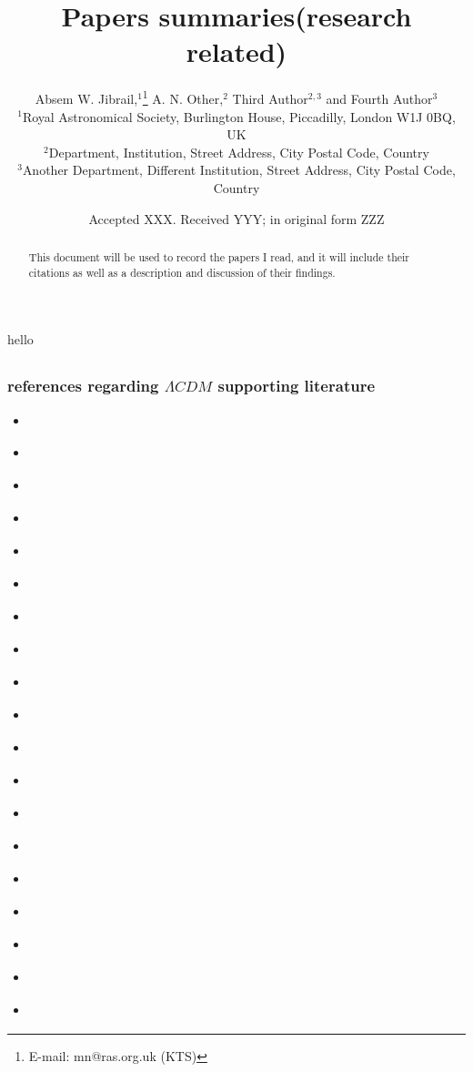 \documentclass[fleqn,usenatbib]{mnras}
\title[Paper summaries (research related)]{Papers summaries(research related)}
\author[K. T. Smith et al.]{
Absem W. Jibrail,$^{1}$\thanks{E-mail: mn@ras.org.uk (KTS)}
A. N. Other,$^{2}$
Third Author$^{2,3}$
and Fourth Author$^{3}$
\\
$^{1}$Royal Astronomical Society, Burlington House, Piccadilly, London W1J 0BQ, UK\\
$^{2}$Department, Institution, Street Address, City Postal Code, Country\\
$^{3}$Another Department, Different Institution, Street Address, City Postal Code, Country
}
\date{Accepted XXX. Received YYY; in original form ZZZ}
\begin{document}
\label{firstpage}
\pagerange{\pageref{firstpage}--\pageref{lastpage}}
\maketitle

\begin{abstract}
This document will be used to record the papers I read, and it will include their citations as well as a description and discussion of their findings.
\end{abstract}

\begin{keywords}
hello
\end{keywords}






\subsection{\citet{Adermann_17}}
\subsubsection{references regarding $\Lambda CDM$ supporting literature}
\begin{itemize}
\item \citet{Riess_98}
\item \citet{Perlmutter_99}
\item \citet{Bennett_13}
\item \citet{Plank_16}
\item \citet{Plank_14b}
\item \citet{Abazajian_09}
\item \citet{Beutler_11}
\item \citet{Beutler_12}
\item \citet{Blake_11}
\item \citet{Anderson_14}
\item \citet{Kilbinger_13}
\item \citet{Heymans_13}
\item \citet{Vikhlinin_09}
\item \citet{Rozo_10}
\item \citet{Tegmark_04}
\item \citet{Reid_10}
\item \citet{Kowalski_08}
\item \citet{Suzuki_12}
\item \citet{Conley_11}
\end{itemize}
\end{document}
